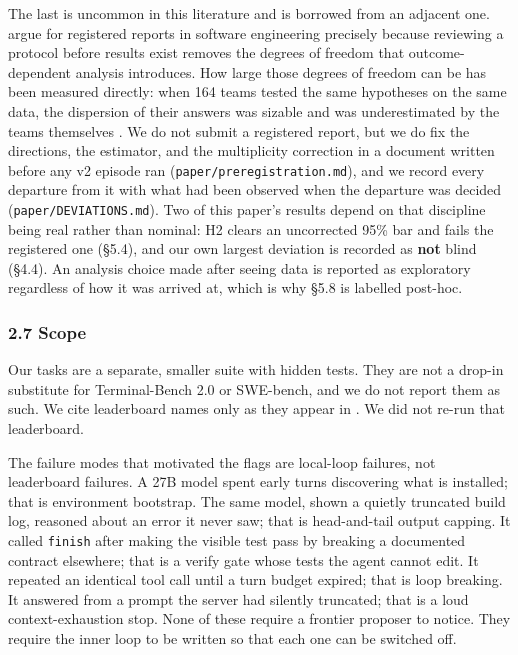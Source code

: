 \documentclass[
  10pt,
  a4paper,
]{article}
\let\oldtexttt\texttt
\renewcommand{\texttt}[1]{{\small\oldtexttt{#1}}}
\begin{document}
The last is uncommon in this literature and is borrowed from an adjacent
one. \citet{ernst2023registered} argue for registered reports in
software engineering precisely because reviewing a protocol before
results exist removes the degrees of freedom that outcome-dependent
analysis introduces. How large those degrees of freedom can be has been
measured directly: when 164 teams tested the same hypotheses on the same
data, the dispersion of their answers was sizable and was underestimated
by the teams themselves \citep{menkveld2024nonstandard}. We do not
submit a registered report, but we do fix the directions, the estimator,
and the multiplicity correction in a document written before any v2
episode ran (\texttt{paper/preregistration.md}), and we record every
departure from it with what had been observed when the departure was
decided (\texttt{paper/DEVIATIONS.md}). Two of this paper's results
depend on that discipline being real rather than nominal: H2 clears an
uncorrected 95\% bar and fails the registered one (§5.4), and our own
largest deviation is recorded as \textbf{not} blind (§4.4). An analysis
choice made after seeing data is reported as exploratory regardless of
how it was arrived at, which is why §5.8 is labelled post-hoc.

\subsubsection{2.7 Scope}\label{scope}

Our tasks are a separate, smaller suite with hidden tests. They are not
a drop-in substitute for Terminal-Bench 2.0 or SWE-bench, and we do not
report them as such. We cite leaderboard names only as they appear in
\citet{lee2026metaharness}. We did not re-run that leaderboard.

The failure modes that motivated the flags are local-loop failures, not
leaderboard failures. A 27B model spent early turns discovering what is
installed; that is environment bootstrap. The same model, shown a
quietly truncated build log, reasoned about an error it never saw; that
is head-and-tail output capping. It called \texttt{finish} after making
the visible test pass by breaking a documented contract elsewhere; that
is a verify gate whose tests the agent cannot edit. It repeated an
identical tool call until a turn budget expired; that is loop breaking.
It answered from a prompt the server had silently truncated; that is a
loud context-exhaustion stop. None of these require a frontier proposer
to notice. They require the inner loop to be written so that each one
can be switched off.
\end{document}

